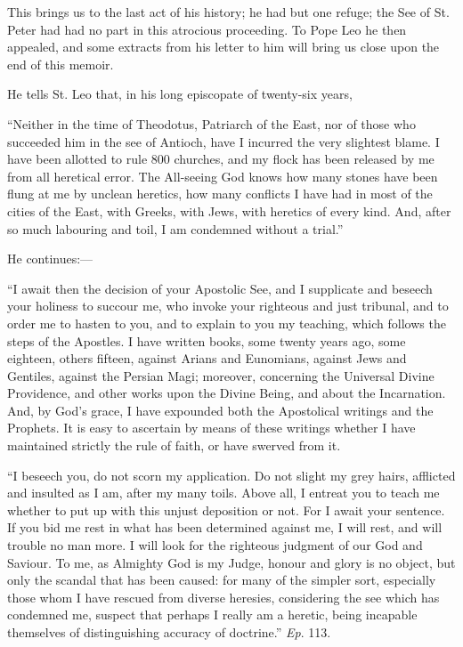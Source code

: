 This brings us to the last act of his history; he had but one
refuge; the See of St. Peter had had no part in this atrocious
proceeding. To Pope Leo he then appealed, and some extracts from his
letter to him will bring us close upon the end of this memoir.

He tells St. Leo that, in his long episcopate of twenty-six years,

``Neither in the time of Theodotus, Patriarch of the East, nor
of those who succeeded him in the see of Antioch, have I incurred the
very slightest blame. I have been allotted to rule 800 churches, and
my flock has been released by me from all heretical error. The
All-seeing God knows how many stones have been flung at me by unclean
heretics, how many conflicts I have had in most of the cities of the
East, with Greeks, with Jews, with heretics of every kind. And, after
so much labouring and toil, I am condemned without a trial.''

He continues:—

``I await then the decision of your Apostolic See, and I
supplicate and beseech your holiness to
succour me, who invoke your righteous and just tribunal, and to order
me to hasten to you, and to explain to you my teaching, which follows
the steps of the Apostles. I have written books, some twenty years
ago, some eighteen, others fifteen, against Arians and Eunomians,
against Jews and Gentiles, against the Persian Magi; moreover,
concerning the Universal Divine Providence, and other works upon the
Divine Being, and about the Incarnation. And, by God's grace, I have
expounded both the Apostolical writings and the Prophets. It is easy
to ascertain by means of these writings whether I have maintained
strictly the rule of faith, or have swerved from it.

``I beseech you, do not scorn my application. Do not slight my
grey hairs, afflicted and insulted as I am, after my many toils. Above
all, I entreat you to teach me whether to put up with this unjust
deposition or not. For I await your sentence. If you bid me rest in
what has been determined against me, I will rest, and will trouble no
man more. I will look for the righteous judgment of our God and
Saviour. To me, as Almighty God is my Judge, honour and glory is no
object, but only the scandal that has been caused: for many of the
simpler sort, especially those whom I have rescued from diverse
heresies, considering the see which has condemned me, suspect that
perhaps I really am a heretic, being incapable themselves of
distinguishing accuracy of doctrine.'' \emph{Ep}. 113.

